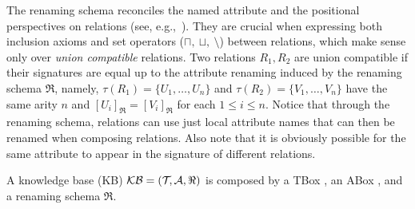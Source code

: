 \documentclass[draft]{article}
\newcommand{\greif}[1]{\ensuremath{\bigocirc#1}}
\newcommand{\lreif}[1]{\ensuremath{\bigodot#1}}
\begin{document}
%
The renaming schema reconciles the named attribute and the positional perspectives on relations (see, e.g.,~\cite{Kanellakis:1990:chapter}). They are crucial when expressing both inclusion axioms and set operators ($\sqcap,~\sqcup,~\setminus$) between relations, which make sense only over \emph{union compatible} relations. Two relations $R_1,R_2$ are union compatible if their signatures are equal up to the attribute renaming induced by the renaming schema $\Re$, namely, $\tau(R_1)=\{U_1,\ldots,U_n\}$ and $\tau(R_2)=\{V_1,\ldots,V_n\}$ have the same arity $n$ and $[U_i]_\Re=[V_i]_\Re$ for each $1\leq i\leq n$. Notice that through the renaming schema, relations can use just local attribute names that can then be renamed when composing relations. Also note that it is obviously possible for the same attribute to appear in the signature of different relations.

%
A \DLRp knowledge base (KB) $\mathcal{KB}=(\mathcal{T}\!,\mathcal{A},\Re)$ is composed by a TBox \Tmc, an ABox \Amc, and a renaming schema $\Re$.
\end{document}
